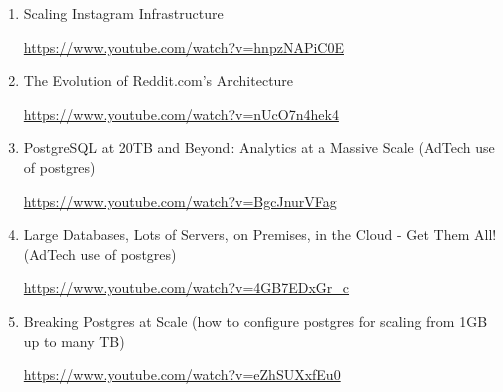 \documentclass[12pt]{exam}
\theoremstyle{definition}
\begin{document}
\begin{enumerate}
    \item Scaling Instagram Infrastructure

   \url{https://www.youtube.com/watch?v=hnpzNAPiC0E}

   \vspace{4in}
\item The Evolution of Reddit.com's Architecture

   \url{https://www.youtube.com/watch?v=nUcO7n4hek4}

   \newpage
\item PostgreSQL at 20TB and Beyond: Analytics at a Massive Scale (AdTech use of postgres)

   \url{https://www.youtube.com/watch?v=BgcJnurVFag}
   \vspace{4in}

\item Large Databases, Lots of Servers, on Premises, in the Cloud - Get Them All! (AdTech use of postgres)

   \url{https://www.youtube.com/watch?v=4GB7EDxGr_c}

   \newpage
\item Breaking Postgres at Scale (how to configure postgres for scaling from 1GB up to many TB)

   \url{https://www.youtube.com/watch?v=eZhSUXxfEu0}
\end{enumerate}
\end{document}
